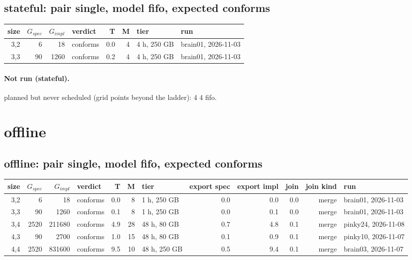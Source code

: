 \documentclass[10pt]{article}
\begin{document}
\subsection*{stateful: pair \textsf{single}, model fifo, expected conforms}
\begin{longtable}{@{}rrrlrrll@{}}
\toprule
size & $G_{\mathit{spec}}$ & $G_{\mathit{impl}}$ & verdict & T & M & tier & run \\
\midrule
\endhead
\color{blue} 3,2 & 6 & 18 & conforms & 0.0 & 4 & 4 h, 250 GB & brain01, 2026-11-03 \\
\color{blue} 3,3 & 90 & 1260 & conforms & 0.2 & 4 & 4 h, 250 GB & brain01, 2026-11-03 \\
\bottomrule
\end{longtable}
\paragraph{Not run (stateful).}
planned but never scheduled (grid points beyond the ladder): 4 4 fifo.\par
\section*{offline}
\subsection*{offline: pair \textsf{single}, model fifo, expected conforms}
\begin{longtable}{@{}rrrlrrlrrrrl@{}}
\toprule
size & $G_{\mathit{spec}}$ & $G_{\mathit{impl}}$ & verdict & T & M & tier & export spec & export impl & join & join kind & run \\
\midrule
\endhead
\color{blue} 3,2 & 6 & 18 & conforms & 0.0 & 8 & 1 h, 250 GB & 0.0 & 0.0 & 0.0 & merge & brain01, 2026-11-03 \\
\color{blue} 3,3 & 90 & 1260 & conforms & 0.1 & 8 & 1 h, 250 GB & 0.0 & 0.1 & 0.0 & merge & brain01, 2026-11-03 \\
\color{blue} 3,4 & 2520 & 211680 & conforms & 4.9 & 28 & 48 h, 80 GB & 0.7 & 4.8 & 0.1 & merge & pinky24, 2026-11-08 \\
\color{blue} 4,3 & 90 & 2700 & conforms & 1.0 & 15 & 48 h, 80 GB & 0.1 & 0.9 & 0.1 & merge & pinky10, 2026-11-07 \\
\color{blue} 4,4 & 2520 & 831600 & conforms & 9.5 & 10 & 48 h, 250 GB & 0.5 & 9.4 & 0.1 & merge & brain03, 2026-11-07 \\
\bottomrule
\end{longtable}
\end{document}
